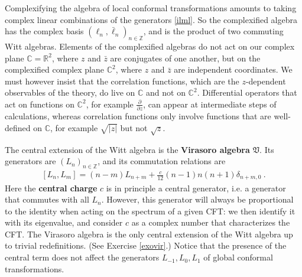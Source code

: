 \documentclass[12pt, a4paper, notitlepage, twoside]{report}
\numberwithin{equation}{section}
\theoremstyle{break}
\begin{document}
Complexifying the algebra of local conformal transformations amounts to taking complex linear combinations of the generators \eqref{ilml}. So the complexified algebra has the complex basis $(\ell_n,\bar\ell_n)_{n\in\mathbb{Z}}$, and is the product of two commuting Witt algebras. Elements of the complexified algebras do not act on our complex plane $\mathbb{C}=\mathbb{R}^2$, where $z$ and $\bar z$ are conjugates of one another, but on the complexified complex plane ${\mathbb{C}}^2$, where $z$ and $\bar z$ are independent coordinates. 
We must however insist that the correlation functions, which are the $z$-dependent observables of the theory, do live on $\mathbb{C}$ and not on ${\mathbb{C}}^2$.
Differential operators that act on functions on ${\mathbb{C}}^2$, for example $\frac{\partial}{\partial z}$, can appear at intermediate steps of calculations, whereas correlation functions only involve functions that are well-defined on $\mathbb{C}$, for example $\sqrt{|z|}$ but not $\sqrt{z}$. 

The central extension of the Witt algebra is the 
\textbf{\boldmath Virasoro algebra} $\mathfrak{V}$.
Its generators are $(L_n)_{n\in {\mathbb{Z}}}$, and its commutation relations are 
\begin{align}
 \boxed{[L_n,L_m]=(n-m)L_{n+m} + \frac{c}{12} (n-1)n(n+1) \delta_{n+m,0}}\ .
\label{vir}
\end{align}
Here the \textbf{\boldmath central charge} $c$ is in principle a central generator, i.e. a generator that commutes with all $L_n$. However, this generator will always be proportional to the identity when acting on the spectrum of a given CFT: we then identify it with its eigenvalue, and consider $c$ as a complex number that characterizes the CFT. 
The Virasoro algebra is the only central extension of the Witt algebra up to trivial redefinitions. (See Exercise \ref{exovir}.) Notice that the presence of the central term does not affect the generators $L_{-1},L_0,L_1$ of global conformal transformations. 
\end{document}
